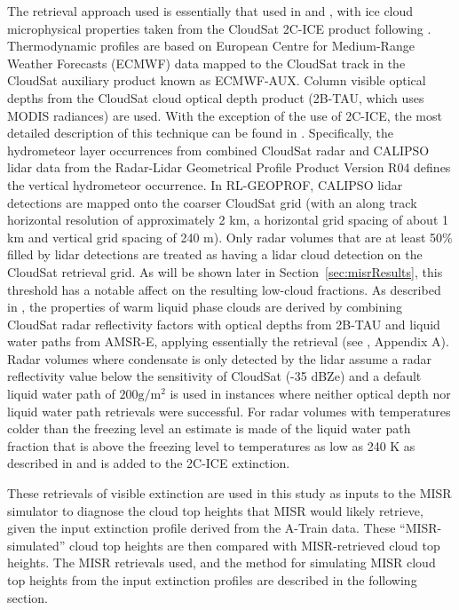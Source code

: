 The retrieval approach used is essentially that used in
\citet{mace_and_wrenn_2013} and \citet{berry_and_mace_2014}, with ice
cloud microphysical properties taken from the CloudSat 2C-ICE product
\citep{deng_et_al_2010, deng_et_al_2013} following
\citet{berry_and_mace_2014}. Thermodynamic profiles are based on
European Centre for Medium-Range Weather Forecasts (ECMWF) data mapped
to the CloudSat track in the CloudSat auxiliary product known as
ECMWF-AUX. Column visible optical depths from the CloudSat cloud optical
depth product (2B-TAU, which uses MODIS radiances) are used. With the
exception of the use of 2C-ICE, the most detailed description of this
technique can be found in \citet{mace_2010}. Specifically, the
hydrometeor layer occurrences from combined CloudSat radar and CALIPSO
lidar data from the Radar-Lidar Geometrical Profile Product
\citep[RL-GEOPROF;][]{mace_et_al_2009, mace_and_zhang_2014} Version R04
defines the vertical hydrometeor occurrence. In RL-GEOPROF, CALIPSO
lidar detections are mapped onto the coarser CloudSat grid (with an
along track horizontal resolution of approximately 2 km, a horizontal
grid spacing of about 1 km and vertical grid spacing of 240 m). Only
radar volumes that are at least 50\% filled by lidar detections are
treated as having a lidar cloud detection on the CloudSat retrieval
grid. As will be shown later in Section~\ref{sec:misrResults}, this
threshold has a notable affect on the resulting low-cloud fractions. As
described in \citet{mace_2010}, the properties of warm liquid phase
clouds are derived by combining CloudSat radar reflectivity factors with
optical depths from 2B-TAU and liquid water paths from AMSR-E, applying
essentially the \citet{dong_and_mace_2003} retrieval (see
\citet{mace_2010}, Appendix A). Radar volumes where condensate is only
detected by the lidar assume a radar reflectivity value below the
sensitivity of CloudSat (-35 dBZe) and a default liquid water path of
\(200 \textrm{g}/\textrm{m}^2\) is used in instances where neither
optical depth nor liquid water path retrievals were successful. For
radar volumes with temperatures colder than the freezing level an
estimate is made of the liquid water path fraction that is above the
freezing level to temperatures as low as 240 K as described in
\citet{mace_et_al_2006} and is added to the 2C-ICE extinction.

These retrievals of visible extinction are used in this study as inputs
to the MISR simulator to diagnose the cloud top heights that MISR would
likely retrieve, given the input extinction profile derived from the
A-Train data. These ``MISR-simulated'' cloud top heights are then
compared with MISR-retrieved cloud top heights. The MISR retrievals
used, and the method for simulating MISR cloud top heights from the
input extinction profiles are described in the following section.

